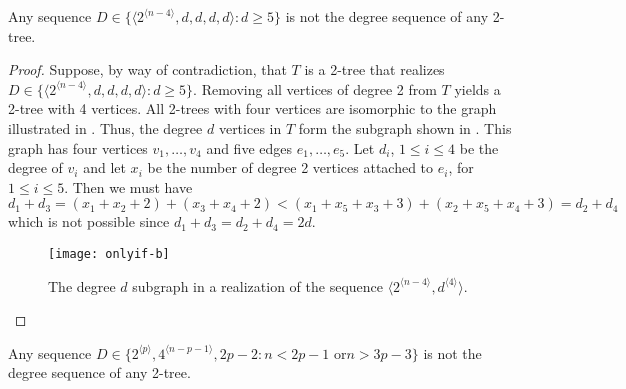 \documentclass[lotsofwhite,charterfonts]{patmorin}
\newcommand{\rep}[1]{^{\langle#1\rangle}}
\begin{document}
\begin{lem}
Any sequence $D\in\{\langle 2\rep{n-4},d,d,d,d\rangle : d\ge 5\}$ is not 
the degree sequence of any 2-tree.
\end{lem}

\begin{proof}
Suppose, by way of contradiction, that $T$ is a 2-tree that realizes
$D\in\{\langle 2\rep{n-4},d,d,d,d\rangle : d\ge 5\}$.  Removing all
vertices of degree 2 from $T$ yields a 2-tree with 4 vertices. All
2-trees with four vertices are isomorphic to the graph illustrated
in 
.  Thus, the degree $d$ vertices in $T$ form the
subgraph shown in .  
This graph has four vertices $v_1,\ldots,v_4$ and five edges
$e_1,\ldots,e_5$. Let $d_i$, $1\le i\le 4$ be the degree of $v_i$ and 
let $x_i$ be
the number of degree 2 vertices attached to $e_i$, for $1\le i\le 5$.
Then we must have
\[
   d_1+d_3 = (x_1 + x_2 + 2) + (x_3 + x_4 + 2)  <
   (x_1 + x_5 + x_3 + 3) + (x_2 + x_5 + x_4 + 3) = d_2 + d_4
\]
which is not possible since $d_1+d_3=d_2+d_4=2d$. 
\begin{figure}
\begin{center}
  \texttt{[image: onlyif-b]}
\end{center}
\caption{The degree $d$ subgraph in a realization of the sequence
$\langle 2\rep{n-4},d\rep{4}\rangle$.}
\end{figure}
\end{proof}


\begin{lem}
Any sequence $D\in\{2\rep{p},4\rep{n-p-1}, 2p-2 : \mbox{$n < 2p-1$ or
$n > 3p-3$} \}$ is not the degree sequence of any 2-tree.
\end{lem}
\end{document}
